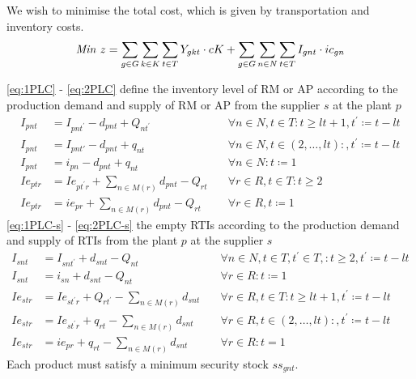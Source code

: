 \FloatBarrier

{We wish to minimise the total cost, which is given by  transportation and inventory costs.}
\begin{equation}
  \text{\textit{Min} } z= \sum_{g \in G}{\sum_{k \in K}{\sum_{t \in T}{Y_{gkt}\cdot cK}}}+ \sum_{g \in G}{\sum_{n \in N}{\sum_{t \in T}{I_{gnt}\cdot ic_{gn}}}}
\end{equation}


\eqref{eq:1PLC} - \eqref{eq:2PLC}  define the inventory level of RM or AP according to the production demand and supply of RM or AP  from the supplier $s$ at the plant  $p$
\begin{align}
  I_{pnt}  & =I_{pnt^{\prime}}-d_{pnt}+Q_{nt^{\prime}}\quad             & \forall n \in N,t \in T : t\ge    lt +1,t^{\prime}\coloneqq t-lt \label{eq:1PLC} \\
  I_{pnt}  & =I_{pnt'}-d_{pnt}+q_{nt}\quad                              & \forall n \in N,t \in (2,\dots, lt) : ,t^{\prime}\coloneqq t-lt\label{eq:3PLC}   \\
  I_{pnt}  & =i_{pn}-d_{pnt}+q_{nt}\quad                                & \forall n \in N: t \coloneqq 1 \label{eq:2PLC}                                   \\
  Ie_{ptr} & =Ie_{pt^{\prime}r}+\sum_{n \in M(r)}{d_{pnt}}-Q_{rt} \quad & \forall r \in R,t \in T : t\ge 2                                                 \\
  Ie_{ptr} & =ie_{pr}+\sum_{n \in M(r)}{d_{pnt}}-Q_{rt}\quad            & \forall r \in R , t\coloneqq 1
\end{align}
\eqref{eq:1PLC-s} - \eqref{eq:2PLC-s}  the empty RTIs according to the production demand and supply of RTIs from the plant $p$ at the supplier $s$
\begin{align}
  I_{snt}  & =I_{snt^{\prime}}+d_{snt}-Q_{nt}\quad                              & \forall n \in N,t \in T,t^{\prime} \in T, : t\ge    2,t^{\prime}\coloneqq t-lt \label{eq:1PLC-s} \\
  I_{snt}  & =i_{sn}+d_{snt}-Q_{nt}\quad                                        & \forall r \in R : t\coloneqq 1 \label{eq:2PLC-s}                                                 \\
  Ie_{str} & =Ie_{st^{\prime}r}+Q_{rt^{\prime}}-\sum_{n \in M(r)}{d_{snt}}\quad & \forall r \in R,t \in T : t\ge    lt +1,t^{\prime}\coloneqq t-lt                                 \\
  Ie_{str} & =Ie_{st^{\prime}r}+q_{rt}-\sum_{n \in M(r)}{d_{snt}}\quad          & \forall r \in R,t \in (2,\dots, lt) : ,t^{\prime}\coloneqq t-lt
  \\
  Ie_{str} & =ie_{pr}+q_{rt}-\sum_{n \in M(r)}{d_{snt}}\quad                    & \forall r \in R:t=1
\end{align}
Each product must satisfy a minimum security stock $ss_{gnt}$.

